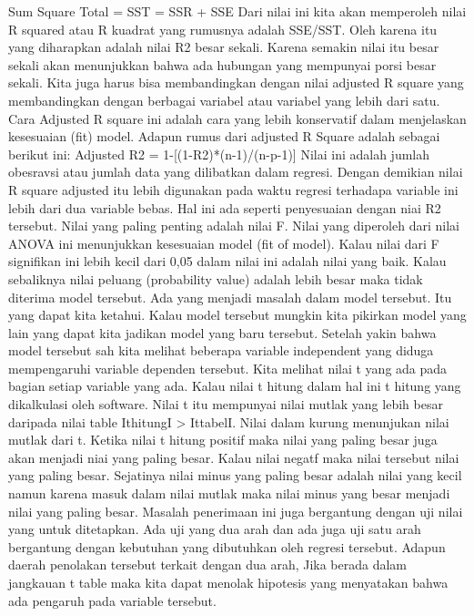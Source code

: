 \documentclass[
]{book}
\theoremstyle{definition}
\theoremstyle{definition}
\theoremstyle{definition}
\theoremstyle{definition}
\theoremstyle{remark}
\begin{document}
Sum Square Total = SST = SSR + SSE
Dari nilai ini kita akan memperoleh nilai R squared atau R kuadrat yang rumusnya adalah SSE/SST. Oleh karena itu yang diharapkan adalah nilai R2 besar sekali. Karena semakin nilai itu besar sekali akan menunjukkan bahwa ada hubungan yang mempunyai porsi besar sekali.
Kita juga harus bisa membandingkan dengan nilai adjusted R square yang membandingkan dengan berbagai variabel atau variabel yang lebih dari satu. Cara Adjusted R square ini adalah cara yang lebih konservatif dalam menjelaskan kesesuaian (fit) model. Adapun rumus dari adjusted R Square adalah sebagai berikut ini:
Adjusted R2 = 1-{[}(1-R2)*(n-1)/(n-p-1){]}
Nilai ini adalah jumlah obesravsi atau jumlah data yang dilibatkan dalam regresi. Dengan demikian nilai R square adjusted itu lebih digunakan pada waktu regresi terhadapa variable ini lebih dari dua variable bebas. Hal ini ada seperti penyesuaian dengan niai R2 tersebut.
Nilai yang paling penting adalah nilai F. Nilai yang diperoleh dari nilai ANOVA ini menunjukkan kesesuaian model (fit of model). Kalau nilai dari F signifikan ini lebih kecil dari 0,05 dalam nilai ini adalah nilai yang baik. Kalau sebaliknya nilai peluang (probability value) adalah lebih besar maka tidak diterima model tersebut. Ada yang menjadi masalah dalam model tersebut. Itu yang dapat kita ketahui. Kalau model tersebut mungkin kita pikirkan model yang lain yang dapat kita jadikan model yang baru tersebut.
Setelah yakin bahwa model tersebut sah kita melihat beberapa variable independent yang diduga mempengaruhi variable dependen tersebut. Kita melihat nilai t yang ada pada bagian setiap variable yang ada. Kalau nilai t hitung dalam hal ini t hitung yang dikalkulasi oleh software. Nilai t itu mempunyai nilai mutlak yang lebih besar daripada nilai table IthitungI \textgreater{} IttabelI. Nilai dalam kurung menunjukan nilai mutlak dari t. Ketika nilai t hitung positif maka nilai yang paling besar juga akan menjadi niai yang paling besar. Kalau nilai negatf maka nilai tersebut nilai yang paling besar. Sejatinya nilai minus yang paling besar adalah nilai yang kecil namun karena masuk dalam nilai mutlak maka nilai minus yang besar menjadi nilai yang paling besar. Masalah penerimaan ini juga bergantung dengan uji nilai yang untuk ditetapkan. Ada uji yang dua arah dan ada juga uji satu arah bergantung dengan kebutuhan yang dibutuhkan oleh regresi tersebut.
Adapun daerah penolakan tersebut terkait dengan dua arah, Jika berada dalam jangkauan t table maka kita dapat menolak hipotesis yang menyatakan bahwa ada pengaruh pada variable tersebut.
\end{document}
